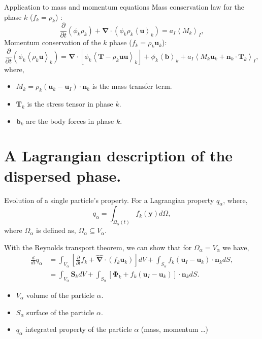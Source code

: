 \documentclass{sintefbeamer}
\newcommand{\kavg}[1]{\left<#1\right>_k}
\newcommand{\Iavg}[1]{\left<#1\right>_I}
\newcommand{\nablab}{\bm{\nabla}}
\newcommand{\nablabh}{\hat{\bm{\nabla}}}
\newcommand{\ddt}{\frac{d}{d t}}
\newcommand{\pddt}{\frac{\partial}{\partial t}}
\begin{document}
\begin{frame}
  {Application to mass and momentum equations}
  Mass conservation law for the phase $k$ ($f_k = \rho_k$) :
  \begin{equation}
    \pddt (\phi_k \rho_k)
    + \nablab \cdot \left(\phi_k \rho_k 
        \kavg{\textbf{u}}
    \right) 
    = a_I\Iavg{M_k},
    \label{eq:avg_k_mass}
\end{equation}
  Momentum conservation of the $k$ phase ($f_k = \rho_k \textbf{u}_k$): 
  \begin{equation}
    \pddt (\phi_k\kavg{\rho_k\textbf{u}}) 
    = \nablab\cdot\left[
        \phi_k \kavg{\textbf{T}
        - \rho_k \textbf{uu}}
    \right]
    +\phi_k\kavg{\textbf{b}}
    + a_I\Iavg{M_k \textbf{u}_k +\textbf{n}_k\cdot\textbf{T}_k},
\end{equation}
where, 
\begin{itemize}
  \item $M_k = \rho_k (\textbf{u}_k-\textbf{u}_I) \cdot \textbf{n}_k$ is the mass transfer term.
  \item $\textbf{T}_k$ is the stress tensor in phase $k$.
  \item $\textbf{b}_k$ are the body forces in phase $k$. 
\end{itemize}
\end{frame}

\section{A Lagrangian description of the dispersed phase.}

\begin{frame}{Evolution of a single particle's property.}
  For a Lagrangian property $q_\alpha$, where,
  \begin{equation}
    q_\alpha
    = \int_{\Omega_\alpha(t)} f_k(\textbf{y}) d\Omega,
    \label{eq:q_alpha}
\end{equation}
where $\Omega_\alpha$ is defined as, $\Omega_\alpha \subseteq  V_\alpha$.

With the Reynolds transport theorem, we can show that for $\Omega_\alpha = V_\alpha$ we have, 
\begin{align*}
  \ddt  q_\alpha 
  &= \int_{V_\alpha}\left[ \pddt f_k + \nablabh \cdot\left(f_k\textbf{u}_k\right) \right]dV 
    + \int_{S_\alpha} f_k (\textbf{u}_I-\textbf{u}_k)\cdot \textbf{n}_k d S,\\
  &= \int_{V_\alpha} \textbf{S}_k dV 
  + \int_{S_\alpha} \left[\bm{\Phi}_k + f_k (\textbf{u}_I-\textbf{u}_k) \right] \cdot \textbf{n}_k d S.
\end{align*}
\begin{itemize}
  \item $V_\alpha$ volume of the particle $\alpha$.
  \item $S_\alpha$ surface of the particle $\alpha$.
  \item $q_\alpha$ integrated property of the particle $\alpha$ (mass, momentum \ldots)
\end{itemize}
\end{frame}
\end{document}
